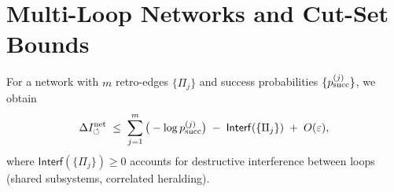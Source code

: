 
\section{Multi-Loop Networks and Cut-Set Bounds}
For a network with $m$ retro-edges $\{\Pi_j\}$ and success probabilities $\{p_{\mathrm{succ}}^{(j)}\}$, we obtain
\[
\Delta I_{\circlearrowleft}^{\mathrm{net}} \;\le\; \sum_{j=1}^m \big( -\log p_{\mathrm{succ}}^{(j)} \big) \;-\; \mathsf{Interf}(\{\Pi_j\}) \;+\; O(\varepsilon),
\]
where $\mathsf{Interf}(\{\Pi_j\})\ge 0$ accounts for destructive interference between loops (shared subsystems, correlated heralding).
